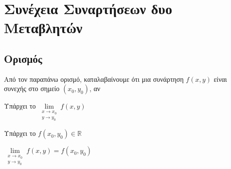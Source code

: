 


\pagestyle{vangelis}
\everymath{\displaystyle}




\chapter{Συνέχεια Συναρτήσεων δυο Μεταβλητών}

\section{Ορισμός}



\begin{rem}
    Από τον παραπάνω ορισμό, καταλαβαίνουμε ότι μια συνάρτηση $ f(x,y) $ είναι συνεχής στο σημείο $
    (x_{0}, y_{0}) $, αν
    \begin{myitemize}
        \item Υπάρχει το $ \lim\limits_{\substack{x\to x_{0} \\y \to y_{0}}} f(x,y) $
        \item Υπάρχει το $ f(x_{0}, y_{0}) \in \mathbb{R} $
        \item $  \lim\limits_{\substack{x\to x_{0} \\y \to y_{0}}} f(x,y)= f(x_{0}, y_{0}) $
    \end{myitemize}
\end{rem}

